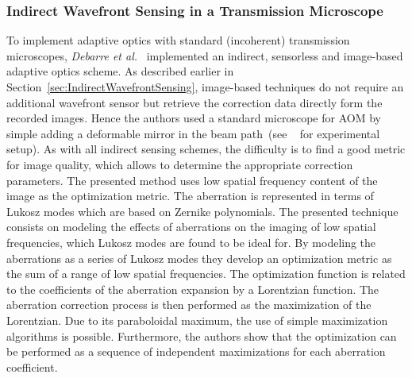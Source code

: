 \subsubsection{Indirect Wavefront Sensing in a Transmission Microscope}
\label{sec:TransmissionMicroscope}

To implement adaptive optics with standard (incoherent) transmission microscopes, \emph{Debarre et al.}~\cite{wide_AOM_loew_freq} implemented an indirect, sensorless and image-based adaptive optics scheme. As described earlier in Section~\ref{sec:IndirectWavefrontSensing}, image-based techniques do not require an additional wavefront sensor but retrieve the correction data directly form the recorded images. Hence the authors used a standard microscope for AOM by simple adding a deformable mirror in the beam path~(see ~\cite{wide_AOM_loew_freq} for experimental setup). As with all indirect sensing schemes, the difficulty is to find a good metric for image quality, which allows to determine the appropriate correction parameters. The presented method uses low spatial frequency content of the image as the optimization metric. The aberration is represented in terms of Lukosz modes which are based on Zernike polynomials. The presented technique consists on modeling the effects of aberrations on the imaging of low spatial frequencies, which Lukosz modes are found to be ideal for. By modeling the aberrations as a series of Lukosz modes they develop an optimization metric as the sum of a range of low spatial frequencies. The optimization function is related to the coefficients of the aberration expansion by a Lorentzian function. The aberration correction process is then performed as the maximization of the Lorentzian. Due to its paraboloidal maximum, the use of simple maximization algorithms is possible. Furthermore, the authors show that the optimization can be performed as a sequence of independent maximizations for each aberration coefficient.

